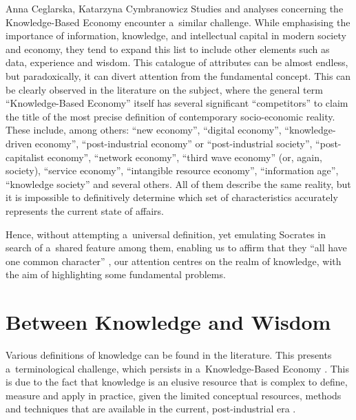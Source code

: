 \begin{artengenv2auth}{Anna Ceglarska, Katarzyna Cymbranowicz}
 Studies and analyses concerning the Knowledge-Based Economy encounter a~similar challenge. While emphasising the importance of information, knowledge, and intellectual capital in modern society and economy, they tend to expand this list to include other elements such as data, experience and wisdom. This catalogue of attributes can be almost endless, but paradoxically, it can divert attention from the fundamental concept. This can be clearly observed in the literature on the subject, where the general term ``Knowledge-Based Economy'' itself has several significant ``competitors'' to claim the title of the most precise definition of contemporary socio-economic reality. These include, among others: ``new economy'', ``digital economy'', ``knowledge-driven economy'', ``post-industrial economy'' or ``post-industrial society'', ``post-capitalist economy'', ``network economy'', ``third wave economy'' (or, again, society), ``service economy'', ``intangible resource economy'', ``information age'', ``knowledge society'' and several others. All of them describe the same reality, but it is impossible to definitively determine which set of characteristics accurately represents the current state of affairs.



Hence, without attempting a~universal definition, yet emulating Socrates in search of a~shared feature among them, enabling us to affirm that they ``all have one common character'' 
\parencite[][72c]{plato_plato_1967}, %
 our attention centres on the realm of knowledge, with the aim of highlighting some fundamental problems.



\section{Between Knowledge and Wisdom}

Various definitions of knowledge can be found in the literature. This presents a~terminological challenge, which persists in a~Knowledge-Based Economy 
\parencites[][]{teece_knowledge_1987}[][]{oecd_knowledge_2000}. %
 This is due to the fact that knowledge is an elusive resource that is complex to define, measure and apply in practice, given the limited conceptual resources, methods and techniques that are available in the current, post-industrial era 
\parencite[][p.20]{strojny_zarzadzanie_2000}.%





\end{artengenv2auth}

